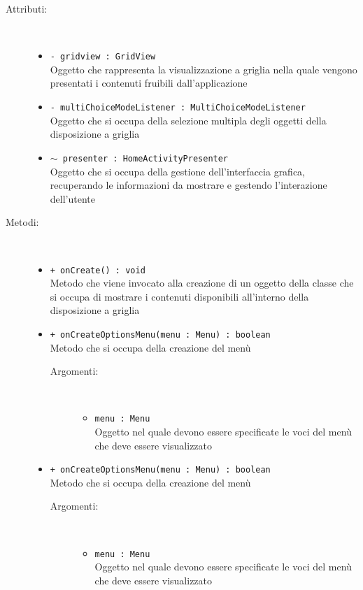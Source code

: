 \documentclass[../Tesi.tex]{subfiles}
\begin{document}
		\begin{description}
			\item[Attributi:] \
			\begin{itemize}
				\item \texttt{- gridview : GridView}\\
				Oggetto che rappresenta la visualizzazione a griglia nella quale vengono presentati i contenuti fruibili dall'applicazione

				\item \texttt{- multiChoiceModeListener : MultiChoiceModeListener}\\
				Oggetto che si occupa della selezione multipla degli oggetti della disposizione a griglia

				\item \texttt{$\sim$ presenter : HomeActivityPresenter}\\
				Oggetto che si occupa della gestione dell'interfaccia grafica, recuperando le informazioni da mostrare e gestendo l'interazione dell'utente

			\end{itemize}

			\item[Metodi:] \
			\begin{itemize}
				\item \texttt{+ onCreate() : void}\\
				Metodo che viene invocato alla creazione di un oggetto della classe  che si occupa di mostrare i contenuti disponibili all'interno della disposizione a griglia
				
				\item \texttt{+ onCreateOptionsMenu(menu : Menu) : boolean}\\
				Metodo che si occupa della creazione del menù
				\begin{description}
					\item[Argomenti:] \
					\begin{itemize}
						\item \texttt{menu : Menu}\\
						Oggetto nel quale devono essere specificate le voci del menù che deve essere visualizzato
					\end{itemize}
				\end{description}

				\item \texttt{+ onCreateOptionsMenu(menu : Menu) : boolean}\\
				Metodo che si occupa della creazione del menù
				\begin{description}
					\item[Argomenti:] \
					\begin{itemize}
						\item \texttt{menu : Menu}\\
						Oggetto nel quale devono essere specificate le voci del menù che deve essere visualizzato
					\end{itemize}
				\end{description}


\end{itemize}
\end{description}
\end{document}
